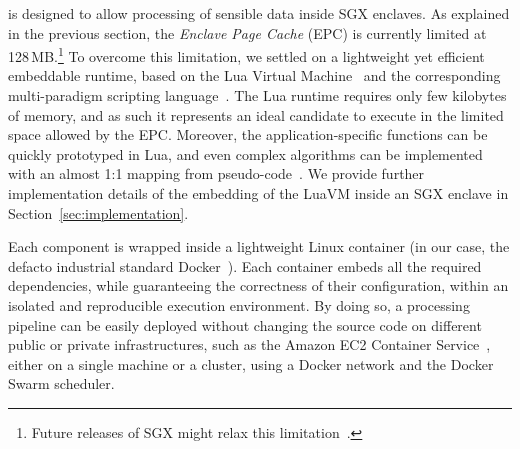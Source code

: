 \SYS is designed to allow processing of sensible data inside SGX enclaves.
As explained in the previous section, the \emph{Enclave Page Cache} (EPC) is currently limited at 128\,MB.\footnote{Future releases of SGX might relax this limitation~\cite{mckeen2016intel}.}
To overcome this limitation, we settled on a lightweight yet efficient embeddable runtime, based on the Lua Virtual Machine~\cite{ierusalimschy_luaextensible_1996} and the corresponding multi-paradigm scripting language~\cite{lualang}.
The Lua runtime requires only few kilobytes of memory, and as such it represents an ideal candidate to execute in the limited space allowed by the EPC.
Moreover, the application-specific functions can be quickly prototyped in Lua, and even complex algorithms can be implemented with an almost 1:1 mapping from pseudo-code~\cite{leonini2009splay}.
We provide further implementation details of the embedding of the LuaVM inside an SGX enclave in Section~\ref{sec:implementation}.



Each component is wrapped inside a lightweight Linux container (in our case, the defacto industrial standard Docker~\cite{docker}).
Each container embeds all the required dependencies, while guaranteeing the correctness of their configuration, within an isolated and reproducible execution environment.
By doing so, a \SYS processing pipeline can be easily deployed without changing the source code on different public or private infrastructures, such as the Amazon EC2 Container Service~\cite{awsec2container}, either on a single machine or a cluster, using a Docker network and the Docker Swarm\cite{docker:swarm_2016} scheduler.

